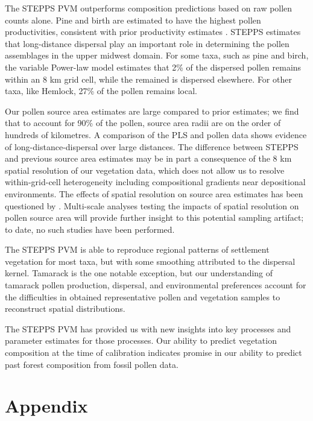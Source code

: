 \documentclass[12pt]{article}
\begin{document}
The STEPPS PVM outperforms composition predictions based on raw pollen
counts alone. Pine and birth are estimated to have the highest pollen
productivities, consistent with prior productivity estimates
\citep{XXX}. STEPPS estimates that long-distance dispersal play an
important role in determining the pollen assemblages in the upper
midwest domain. For some taxa, such as pine and birch, the variable
Power-law model estimates that 2\% of the dispersed pollen remains
within an 8 km grid cell, while the remained is dispersed
elsewhere. For other taxa, like Hemlock, 27\% of the pollen remains
local.

Our pollen source area estimates are large compared to prior
estimates; we find that to account for 90\% of the pollen, source area
radii are on the order of hundreds of kilometres. A comparison of the
PLS and pollen data shows evidence of long-distance-dispersal over
large distances. The difference between STEPPS and previous source
area estimates may be in part a consequence of the 8 km spatial
resolution of our vegetation data, which does not allow us to resolve
within-grid-cell heterogeneity including compositional gradients near
depositional environments. The effects of spatial resolution on source
area estimates has been questioned by
\citet{sugita1994pollen}. Multi-scale analyses testing the impacts of
spatial resolution on pollen source area will provide further insight
to this potential sampling artifact; to date, no such studies have
been performed.


The STEPPS PVM is able to reproduce regional patterns of settlement
vegetation for most taxa, but with some smoothing attributed to the
dispersal kernel. Tamarack is the one notable exception, but our
understanding of tamarack pollen production, dispersal, and
environmental preferences account for the difficulties in obtained
representative pollen and vegetation samples to reconstruct spatial
distributions.

The STEPPS PVM has provided us with new insights into key processes
and parameter estimates for those processes. Our ability to predict
vegetation composition at the time of calibration indicates promise in
our ability to predict past forest composition from fossil pollen
data.

%


\appendix
\section{Appendix}
\label{append}


\newpage

\end{document}
